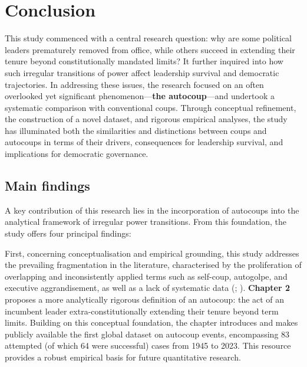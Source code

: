 \documentclass[
  12pt,
]{report}
\begin{document}
\chapter{Conclusion}\label{conclusion}

This study commenced with a central research question: why are some
political leaders prematurely removed from office, while others succeed
in extending their tenure beyond constitutionally mandated limits? It
further inquired into how such irregular transitions of power affect
leadership survival and democratic trajectories. In addressing these
issues, the research focused on an often overlooked yet significant
phenomenon---\textbf{the autocoup}---and undertook a systematic
comparison with conventional coups. Through conceptual refinement, the
construction of a novel dataset, and rigorous empirical analyses, the
study has illuminated both the similarities and distinctions between
coups and autocoups in terms of their drivers, consequences for
leadership survival, and implications for democratic governance.

\section{Main findings}\label{main-findings}

A key contribution of this research lies in the incorporation of
autocoups into the analytical framework of irregular power transitions.
From this foundation, the study offers four principal findings:

First, concerning conceptualisation and empirical grounding, this study
addresses the prevailing fragmentation in the literature, characterised
by the proliferation of overlapping and inconsistently applied terms
such as self-coup, autogolpe, and executive aggrandisement, as well as a
lack of systematic data
(;
). \textbf{Chapter 2}
proposes a more analytically rigorous definition of an autocoup: the act
of an incumbent leader extra-constitutionally extending their tenure
beyond term limits. Building on this conceptual foundation, the chapter
introduces and makes publicly available the first global dataset on
autocoup events, encompassing 83 attempted (of which 64 were successful)
cases from 1945 to 2023. This resource provides a robust empirical basis
for future quantitative research.
\end{document}
